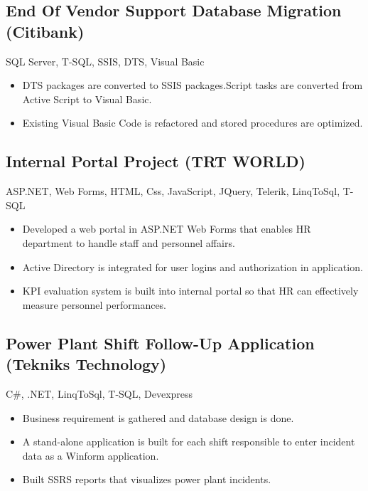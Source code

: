 \documentclass[1pt,a4paper,verdana]{moderncv} %
\begin{document}
\subsection{End Of Vendor Support Database Migration (Citibank)}
 {SQL Server, T-SQL, SSIS, DTS, Visual Basic}
 {\begin{itemize}
		\item DTS packages are converted to SSIS packages.Script tasks are converted from Active Script to Visual Basic.
		\item Existing Visual Basic Code is refactored and stored procedures are optimized.
\end{itemize}}

\subsection{Internal Portal Project (TRT WORLD)}
 {ASP.NET, Web Forms, HTML, Css, JavaScript, JQuery, Telerik, LinqToSql, T-SQL}
 {\begin{itemize}
		\item Developed a web portal in ASP.NET Web Forms that enables HR department to handle staff and personnel affairs.
		\item Active Directory is integrated for user logins and authorization in application.
		\item KPI evaluation system is built into internal portal so that HR can effectively measure personnel performances.
\end{itemize}}

\subsection{Power Plant Shift Follow-Up Application (Tekniks Technology)}
 {C\#, .NET, LinqToSql, T-SQL, Devexpress}
 {\begin{itemize}
		\item Business requirement is gathered and database design is done.
		\item A stand-alone application is built for each shift responsible to enter incident data as a Winform application.
		\item Built SSRS reports that visualizes power plant incidents.
\end{itemize}}
\end{document}
